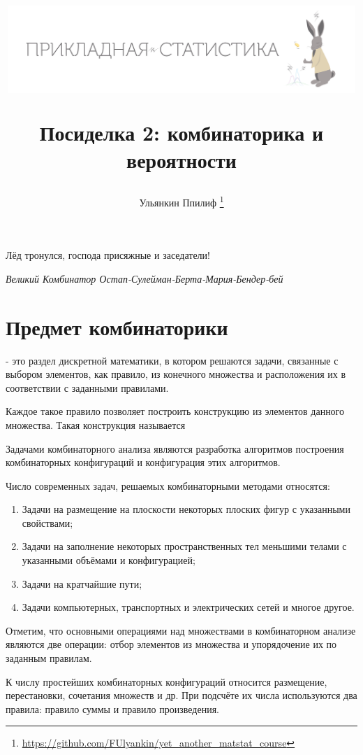 \documentclass[12pt, a4paper]{article}
\title{
\begin{center} 
\includegraphics[width=0.99\textwidth]{images/logo.png}
\end{center}

Посиделка 2: комбинаторика и вероятности}
\date{ } %
\author{Ульянкин Ппилиф \thanks{\url{https://github.com/FUlyankin/yet_another_matstat_course}}}
\begin{document}

\maketitle

\epigraph{Лёд тронулся, господа присяжные и заседатели!}{\textit{Великий Комбинатор Остап-Сулейман-Берта-Мария-Бендер-бей}}








\section{Предмет комбинаторики}

 - это раздел дискретной математики, в котором решаются задачи, связанные с выбором элементов, как правило, из конечного множества и расположения их в соответствии с заданными правилами. \par 
Каждое такое правило позволяет построить конструкцию из элементов данного множества. Такая конструкция называется  \par 
Задачами комбинаторного анализа являются разработка алгоритмов построения комбинаторных конфигураций и конфигурация этих алгоритмов. \par 
Число современных задач, решаемых комбинаторными методами относятся: 

\begin{enumerate}
    
    \item Задачи на размещение на плоскости некоторых плоских фигур с указанными свойствами;
    
    \item Задачи на заполнение некоторых пространственных тел меньшими телами с указанными объёмами и конфигурацией;
    
    \item Задачи на кратчайшие пути;
    
    \item Задачи компьютерных, транспортных и электрических сетей и многое другое.

\end{enumerate}

Отметим, что основными операциями над множествами в комбинаторном анализе являются две операции: отбор элементов из множества и упорядочение их по заданным правилам.\par 
К числу простейших комбинаторных конфигураций относится размещение, перестановки, сочетания множеств и др. При подсчёте их числа используются два правила: правило суммы и правило произведения.
\end{document}
